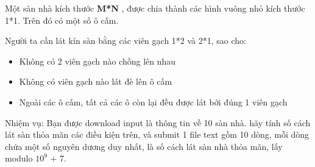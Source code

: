 Một sàn nhà kích thước   \textbf{    M*N   }   , được chia thành các hình vuông nhỏ kích thước 1*1. Trên đó có một số ô cấm.  

   Người ta cần lát kín sàn bằng các viên gạch 1*2 và 2*1, sao cho:  
\begin{itemize}
	\item     Không có 2 viên gạch nào chồng lên nhau   
	\item     Không có viên gạch nào lát đè lên ô cấm   
	\item     Ngoài các ô cấm, tất cả các ô còn lại đều được lát bởi đúng 1 viên gạch   
\end{itemize}

   Nhiệm vụ: Bạn được download input là thông tin về 10 sàn nhà. hãy tính số cách lát sàn thỏa mãn các điều kiện trên, và submit 1 file text gồm 10 dòng, mỗi dòng chứa một số nguyên dương duy nhất, là số cách lát sàn nhà thỏa mãn, lấy modulo $10^{9}$   + 7.